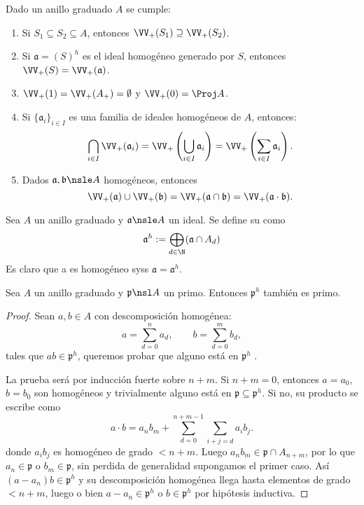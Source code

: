 \addtocounter{thmi}{1}
\begin{slem}
	Dado un anillo graduado $A$ se cumple:
	\begin{enumerate}
		\item Si $S_1 \subseteq S_2 \subseteq A$, entonces $\VV_+(S_1) \supseteq \VV_+(S_2)$.
		\item Si $\mathfrak{a} = (S)^h$ es el ideal homogéneo generado por $S$, entonces $\VV_+(S) = \VV_+(\mathfrak{a})$.
		\item $\VV_+(1) = \VV_+(A_+) = \emptyset$ y $\VV_+(0) = \Proj A$.
		\item Si $\{ \mathfrak{a}_i \}_{i\in I}$ es una familia de ideales homogéneos de $A$, entonces:
			$$ \bigcap_{i\in I} \VV_+(\mathfrak{a}_i) = \VV_+\left( \bigcup_{i\in I} \mathfrak{a}_i \right)
			= \VV_+\left( \sum_{i\in I} \mathfrak{a}_i \right). $$
		\item Dados $\mathfrak{a, b} \nsle A$ homogéneos, entonces
			$$ \VV_+(\mathfrak{a}) \cup \VV_+(\mathfrak{b}) = \VV_+(\mathfrak{a \cap b}) = \VV_+(\mathfrak{a \cdot b}). $$
	\end{enumerate}
\end{slem}
\addtocounter{thmi}{-1}
\begin{mydef}
	Sea $A$ un anillo graduado y $\mathfrak{a} \nsle A$ un ideal.
	Se define su  como
	$$ \mathfrak{a}^h := \bigoplus_{d\in\N} (\mathfrak{a} \cap A_d) $$
	Es claro que a es homogéneo syss $\mathfrak{a} = \mathfrak{a}^h$.
\end{mydef}

\begin{lem}
	Sea $A$ un anillo graduado y $\mathfrak{p} \nsl A$ un primo.
	Entonces $\mathfrak{p}^h$ también es primo.
\end{lem}
\begin{proof}
	Sean $a, b \in A$ con descomposición homogénea:
	$$ a = \sum_{d=0}^{n} a_d, \qquad b = \sum_{d=0}^{m} b_d, $$
	tales que $ab \in \mathfrak{p}^h$, queremos probar que alguno está en $\mathfrak{p}^h$ .

	La prueba será por inducción fuerte sobre $n + m$.
	Si $n + m = 0$, entonces $a = a_0$, $b = b_0$ son homogéneos y trivialmente alguno está en $\mathfrak{p} \subseteq \mathfrak{p}^h$.
	Si no, su producto se escribe como 
	$$ a \cdot b = a_n b_m + \sum_{d=0}^{n+m-1} \sum_{i+j=d} a_i b_j. $$
	donde $a_i b_j$ es homogéneo de grado $< n + m$. Luego $a_n b_m \in \mathfrak{p} \cap A_{n+m}$,
	por lo que $a_n \in \mathfrak{p}$ o $b_m \in \mathfrak{p}$, sin perdida de generalidad supongamos el primer caso.
	Así $(a - a_n )b \in \mathfrak{p}^h$ y su descomposición homogénea llega hasta elementos de grado $< n + m$, luego o bien $a - a_n \in \mathfrak{p}^h$
	o $b \in \mathfrak{p}^h$ por hipótesis inductiva.
\end{proof}

